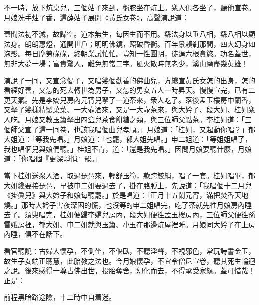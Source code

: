 不一時，放下炕桌兒，三個姑子來到，盤膝坐在炕上。衆人俱各坐了，聽他宣卷。月娘洗手炷了香，這薛姑子展開《黃氏女卷》，高聲演說道：

\begin{myquote}[\markfont]
蓋聞法初不滅，故歸空。道本無生，每因生而不用。繇法身以垂八相，繇八相以顯法身。朗朗惠燈，通開世戶；明明佛鏡，照破昏衢。百年景賴剎那間，四大幻身如泡影。每日塵勞碌碌，終朝業試忙忙。豈知一性圓明，徒逞六根貪慾。功名蓋世，無非大夢一場；富貴驚人，難免無常二字。風火散時無老少，溪山磨盡幾英雄！
\end{myquote}

演說了一囘，又宣念偈子，又唱幾個勸善的佛曲兒，方纔宣黃氏女怎的出身，怎的看經好善，又怎的死去轉世為男子，又怎的男女五人一時昇天。慢慢宣完，已有二更天氣。先是李嬌兒房內元宵兒拏了一道茶來，衆人吃了。落後孟玉樓房中蘭香，又拏了幾樣精製菓菜、一大壺酒來，又是一大壺茶來，與大妗子、段大姐、桂姐衆人吃。月娘又教玉簫拏出四盒兒茶食餅糖之類，與三位師父點茶。李桂姐道：「三個師父宣了這一囘卷，也該我唱個曲兒孝順。」月娘道：「桂姐，又起動你唱？」郁大姐道：「等我先唱。」月娘道：「也罷，郁大姐先唱。」申二姐道：「等姐姐唱了，我也唱個兒與娘們聽。」桂姐不肯，道：「還是我先唱。」因問月娘要聽什麼，月娘道：「你唱個『更深靜悄』罷。」

當下桂姐送衆人酒，取過琵琶來，輕舒玉筍，款跨鮫綃，唱了一套。桂姐唱畢，郁大姐纔要接琵琶，早被申二姐要過去了，{}掛在胳膊上，先說道：「我唱個十二月兒《掛眞兒》與大妗子和娘每聽罷。」於是唱道：「正月十五鬧元宵，滿把焚香天地燒。」那時大妗子害夜深困的慌，也沒等的申二姐唱完，吃了茶就先徃月娘房內睡去了。須臾唱完，桂姐便歸李嬌兒房內，段大姐便徃孟玉樓房內，三位師父便徃孫雪娥房裡，郁大姐、申二姐就與玉簫、小玉在那邊炕屋裡睡。月娘同大妗子在上房內睡，俱不在話下。

看官聽說：古婦人懷孕，不側坐，不偃臥，不聽淫聲，不視邪色，常玩詩書金玉，故生子女端正聰慧，此胎教之法也。今月娘懷孕，不宜令僧尼宣卷，聽其死生輪迴之說。後來感得一尊古佛出世，投胎奪舍，幻化而去，不得承受家緣。蓋可惜哉！正是：

\begin{myquote} 
前程黑暗路途險，十二時中自着迷。
\end{myquote} 

